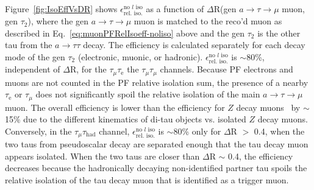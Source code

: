 Figure~\ref{fig:IsoEffVsDR} shows $\epsilon_{\text{rel. iso.}}^{\text{no }l\text{ iso}}$ as a function of $\Delta$R(gen $a\rightarrow\tau\rightarrow\mu$ muon, gen $\tau_{\text{2}}$), where the gen $a\rightarrow\tau\rightarrow\mu$ muon is matched to the reco'd muon as described in Eq.~\ref{eq:muonPFRelIsoeff-noliso} above and the gen $\tau_{\text{2}}$ is the other tau from the $a\rightarrow\tau\tau$ decay.  The efficiency is calculated separately for each decay mode of the gen $\tau_{\text{2}}$ (electronic, muonic, or hadronic).  $\epsilon_{\text{rel. iso.}}^{\text{no }l\text{ iso}}$ is $\sim$80\%, independent of $\Delta$R, for the $\tau_{\mu}\tau_{\text{e}}$ the $\tau_{\mu}\tau_{\mu}$ channels.  Because PF electrons and muons are not counted in the PF relative isolation sum, the presence of a nearby $\tau_{\text{e}}$ or $\tau_{\mu}$ does not significantly spoil the relative isolation of the main $a\rightarrow\tau\rightarrow\mu$ muon.  The overall efficiency is lower than the efficiency for $Z$ decay muons~\cite{1748-0221-7-10-P10002} by $\sim$15\% due to the different kinematics of di-tau objects vs. isolated $Z$ decay muons.  Conversely, in the $\tau_{\mu}\tau_{\text{had}}$ channel, $\epsilon_{\text{rel. iso.}}^{\text{no }l\text{ iso}}$ is $\sim$80\% only for $\Delta$R $>$ 0.4, when the two taus from pseudoscalar decay are separated enough that the tau decay muon appears isolated.  When the two taus are closer than $\Delta$R $\sim$ 0.4, the efficiency decreases because the hadronically decaying non-identified partner tau spoils the relative isolation of the tau decay muon that is identified as a trigger muon.

